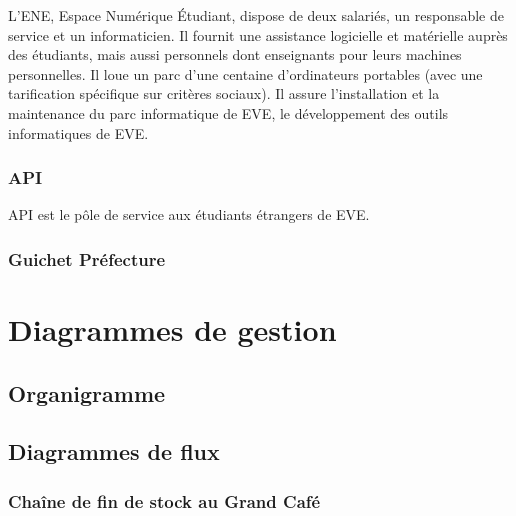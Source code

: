 L'ENE, Espace Numérique Étudiant, dispose de deux salariés, un
responsable de service et un informaticien.
Il fournit une assistance logicielle et matérielle auprès des étudiants,
mais aussi personnels dont enseignants pour leurs machines personnelles.
Il loue un parc d'une centaine d'ordinateurs portables (avec une tarification
spécifique sur critères sociaux). Il assure l'installation et la maintenance
du parc informatique de EVE, le développement des outils informatiques de EVE.

\subsubsection{API}

API est le pôle de service aux étudiants étrangers de EVE.

\subsubsection{Guichet Préfecture}

\section{Diagrammes de gestion}
\subsection{Organigramme}

\subsection{Diagrammes de flux}

\subsubsection{Chaîne de fin de stock au Grand Café}

